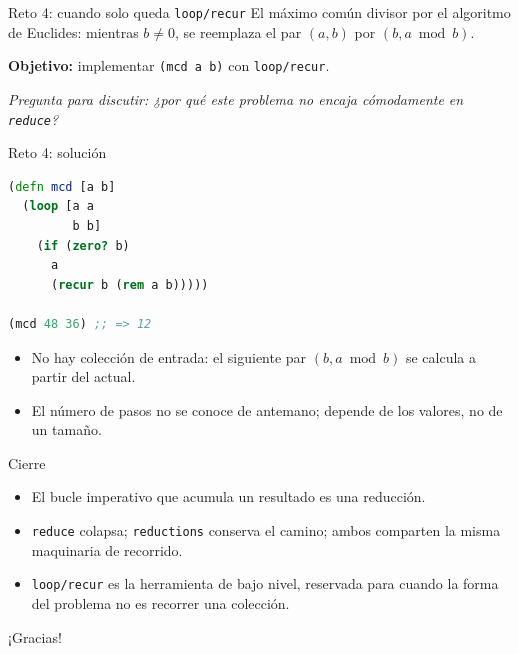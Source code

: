 \documentclass{beamer}
\begin{document}
\begin{frame}[fragile]{Reto 4: cuando solo queda \texttt{loop/recur}}
    El máximo común divisor por el algoritmo de Euclides: mientras $b \neq 0$, se reemplaza el par $(a, b)$ por $(b, a \bmod b)$.

    \vspace{0.3cm}
    \textbf{Objetivo:} implementar \texttt{(mcd a b)} con \texttt{loop/recur}.

    \vspace{0.3cm}
    \textit{Pregunta para discutir: ¿por qué este problema no encaja cómodamente en \texttt{reduce}?}
\end{frame}

\begin{frame}[fragile]{Reto 4: solución}
    \begin{lstlisting}[language=Clojure]
(defn mcd [a b]
  (loop [a a
         b b]
    (if (zero? b)
      a
      (recur b (rem a b)))))

(mcd 48 36) ;; => 12
    \end{lstlisting}

    \begin{itemize}
        \item No hay colección de entrada: el siguiente par $(b, a \bmod b)$ se calcula a partir del actual.
        \item El número de pasos no se conoce de antemano; depende de los valores, no de un tamaño.
    \end{itemize}
\end{frame}

\begin{frame}{Cierre}
    \begin{itemize}
        \item El bucle imperativo que acumula un resultado es una reducción.
        \item \texttt{reduce} colapsa; \texttt{reductions} conserva el camino; ambos comparten la misma maquinaria de recorrido.
        \item \texttt{loop/recur} es la herramienta de bajo nivel, reservada para cuando la forma del problema no es recorrer una colección.
    \end{itemize}
\end{frame}

\begin{emptyframe}
    ¡Gracias!\\
    \vspace{0.5cm}
\end{emptyframe}
\end{document}
